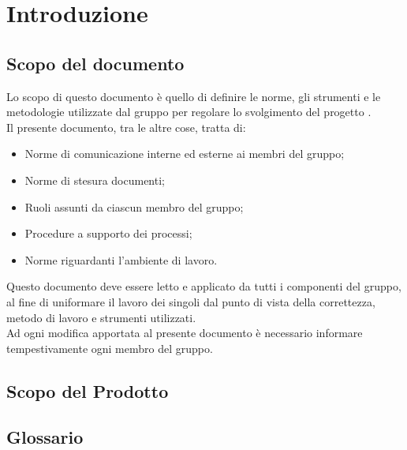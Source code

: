 \section{Introduzione}

\subsection{Scopo del documento}

Lo scopo di questo documento è quello di definire le norme, gli strumenti e le metodologie utilizzate dal gruppo \GroupName per regolare lo svolgimento del progetto \ProjectName{}.\\
Il presente documento, tra le altre cose, tratta di:
\begin{itemize}
	\item Norme di comunicazione interne ed esterne ai membri del gruppo;
	\item Norme di stesura documenti;
	\item Ruoli assunti da ciascun membro del gruppo;
	\item Procedure a supporto dei processi;
	\item Norme riguardanti l’ambiente di lavoro.
\end{itemize}
Questo documento deve essere letto e applicato da tutti i componenti del gruppo, al fine di uniformare il lavoro dei singoli dal punto di vista della correttezza, metodo di lavoro e strumenti utilizzati.\\
Ad ogni modifica apportata al presente documento è necessario informare tempestivamente ogni membro del gruppo.
\subsection{Scopo del Prodotto}
\ScopoDelProdotto

\subsection{Glossario}
\GlossarioIntroduzione






